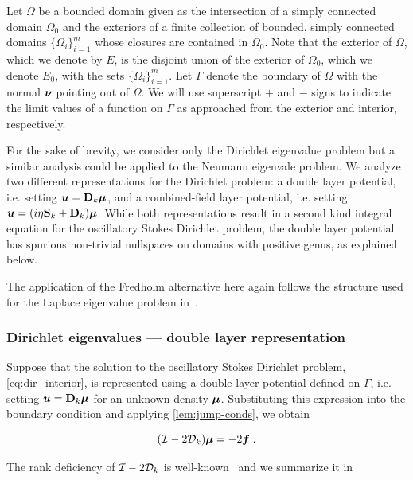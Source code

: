 Let $\Omega$ be a bounded domain given as
the intersection of a simply connected domain $\Omega_0$ and
the exteriors of a finite collection of bounded,
simply connected domains $\{ \Omega_i \}_{i=1}^m$
whose closures are contained in $\Omega_0$. Note that the
exterior of $\Omega$, which we denote by $E$, is the
disjoint union of the exterior of $\Omega_0$, which we
denote $E_0$, with the sets $\{ \Omega_i \}_{i=1}^m$.
Let $\Gamma$ denote the boundary of $\Omega$ with the normal
${\boldsymbol \nu}$ pointing out of $\Omega$.
We will use superscript $+$ and $-$ signs
to indicate the limit values of a function on $\Gamma$
as approached from the exterior and interior, respectively.

For the sake of brevity, we consider only the
Dirichlet eigenvalue problem but a similar analysis
could be applied to the Neumann eigenvale problem.
We analyze two different representations for the
Dirichlet problem: a double layer potential,
i.e. setting ${\boldsymbol u}={\bf D}_{k} {\boldsymbol \mu}$, and a combined-field
layer potential, i.e. setting
${\boldsymbol u}=(i\eta {\bf S}_{k} + {\bf D}_{k}){\boldsymbol \mu}$. 
While both representations result in a second kind
integral equation for the oscillatory Stokes Dirichlet
problem, the double layer potential has spurious non-trivial
nullspaces on domains with positive genus, as
explained below.

\begin{remark}
  The application of the Fredholm alternative here
  again follows the structure used for the Laplace
  eigenvalue problem in~\cite[Ch. 3]{colton1983integral}.
\end{remark}


\subsubsection{Dirichlet eigenvalues --- double layer
  representation}
\label{subsec:dlanalysis}
Suppose that the solution to the oscillatory
Stokes Dirichlet problem, \cref{eq:dir_interior},
is represented using a double layer potential defined
on $\Gamma$, i.e. setting ${\boldsymbol u} = {\bf D}_{k} {\boldsymbol \mu}$ for
an unknown density ${\boldsymbol \mu}$. 
Substituting this expression
into the boundary condition and applying
\cref{lem:jump-conds}, we obtain

\begin{equation}
  (\mathcal I - 2{\mathcal D}_{k}) {\boldsymbol \mu} = -2{\boldsymbol f} \; . \label{eq:inteq_dir_int}
\end{equation}

The rank deficiency of $\mathcal I-2{\mathcal D}_{k}$ is
well-known~\cite{biros2002embedded} and we summarize it
in

